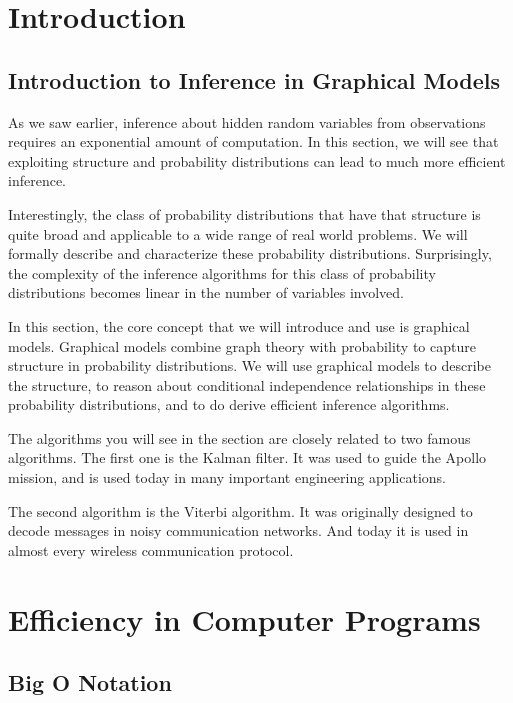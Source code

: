 \documentclass[6008notes.tex]{subfiles}
\begin{document}
\graphicspath{ {images/efficiency/} }

\section{Introduction}

\subsection{Introduction to Inference in Graphical Models}

As we saw earlier, inference about hidden random variables from observations requires an exponential amount of computation. In this section, we will see that exploiting structure and probability distributions can lead to much more efficient inference.

Interestingly, the class of probability distributions that have that structure is quite broad and applicable to a wide range of real world problems. We will formally describe and characterize these probability distributions. Surprisingly, the complexity of the inference algorithms for this class of probability distributions becomes linear in the number of variables involved.

In this section, the core concept that we will introduce and use is graphical models. Graphical models combine graph theory with probability to capture structure in probability distributions. We will use graphical models to describe the structure, to reason about conditional independence relationships in these probability distributions, and to do derive efficient inference algorithms.

The algorithms you will see in the section are closely related to two famous algorithms. The first one is the Kalman filter. It was used to guide the Apollo mission, and is used today in many important engineering applications.

The second algorithm is the Viterbi algorithm. It was originally designed to decode messages in noisy communication networks. And today it is used in almost every wireless communication protocol.


\section{Efficiency in Computer Programs}

\subsection{Big O Notation}
\end{document}

